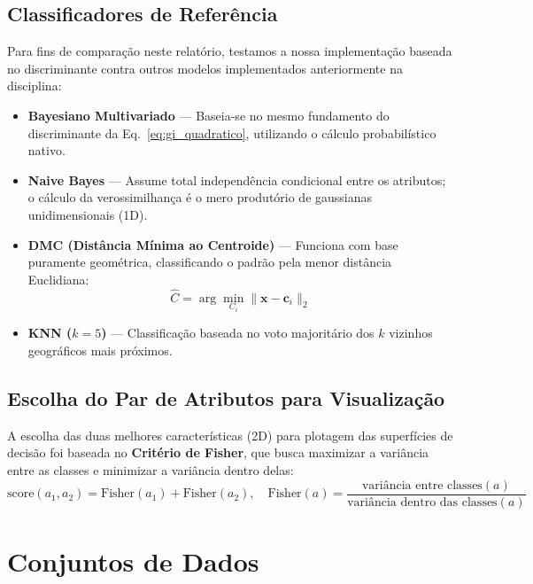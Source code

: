 \documentclass[12pt, a4paper]{article}
\begin{document}
\subsection{Classificadores de Referência}
Para fins de comparação neste relatório, testamos a nossa implementação baseada no discriminante contra outros modelos implementados anteriormente na disciplina:
\begin{itemize}
    \item \textbf{Bayesiano Multivariado} — Baseia-se no mesmo fundamento do discriminante da Eq.~\eqref{eq:gi_quadratico}, utilizando o cálculo probabilístico nativo.
    \item \textbf{Naive Bayes} — Assume total independência condicional entre os atributos; o cálculo da verossimilhança é o mero produtório de gaussianas unidimensionais (1D).
    \item \textbf{DMC (Distância Mínima ao Centroide)} — Funciona com base puramente geométrica, classificando o padrão pela menor distância Euclidiana:
    \begin{equation}
    \hat{C} = \arg\min_{C_i}\|\mathbf{x}-\boldsymbol{c}_i\|_2
    \end{equation}
    \item \textbf{KNN ($k=5$)} — Classificação baseada no voto majoritário dos $k$ vizinhos geográficos mais próximos.
\end{itemize}

\subsection{Escolha do Par de Atributos para Visualização}
A escolha das duas melhores características (2D) para plotagem das superfícies de decisão foi baseada no \textbf{Critério de Fisher}, que busca maximizar a variância entre as classes e minimizar a variância dentro delas:
\begin{equation}
    \text{score}(a_1, a_2) = \text{Fisher}(a_1) + \text{Fisher}(a_2), \quad \text{Fisher}(a) = \frac{\text{variância entre classes}(a)}{\text{variância dentro das classes}(a)}
\end{equation}

\section{Conjuntos de Dados}
\end{document}
